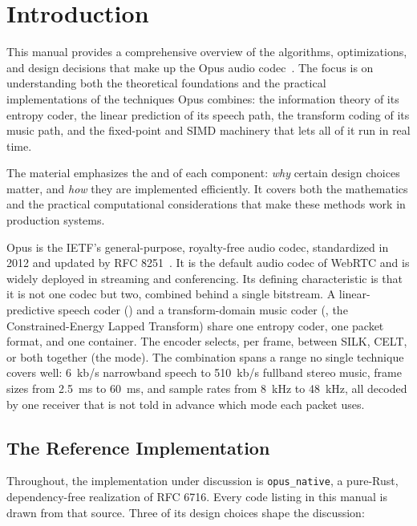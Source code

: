 
\section{Introduction}\label{sec:introduction}

This manual provides a comprehensive overview of the algorithms,
optimizations, and design decisions that make up the Opus audio
codec~\cite{rfc6716}. The focus is on understanding both the theoretical
foundations and the practical implementations of the techniques Opus combines:
the information theory of its entropy coder, the linear prediction of its speech
path, the transform coding of its music path, and the fixed-point and SIMD
machinery that lets all of it run in real time.

The material emphasizes the  and  of each component:
\emph{why} certain design choices matter, and \emph{how} they are implemented
efficiently. It covers both the mathematics and the practical computational
considerations that make these methods work in production systems.

Opus is the IETF's general-purpose, royalty-free audio codec, standardized in
2012 and updated by RFC 8251~\cite{rfc8251}. It is the default audio codec of
WebRTC and is widely deployed in streaming and conferencing. Its defining
characteristic is that it is not one codec but two, combined behind a single
bitstream. A linear-predictive speech coder () and a
transform-domain music coder (, the Constrained-Energy Lapped
Transform) share one entropy coder, one packet format, and one container. The
encoder selects, per frame, between SILK, CELT, or both together (the
 mode). The combination spans a range no single technique covers
well: 6~kb/s narrowband speech to 510~kb/s fullband stereo music, frame sizes
from 2.5~ms to 60~ms, and sample rates from 8~kHz to 48~kHz, all decoded by one
receiver that is not told in advance which mode each packet uses.

\subsection{The Reference Implementation}\label{subsec:reference_impl}

Throughout, the implementation under discussion is
\texttt{opus\_native}, a pure-Rust, dependency-free realization of RFC 6716.
Every code listing in this manual is drawn from that source. Three of its design
choices shape the discussion:


